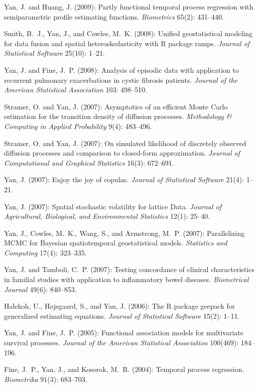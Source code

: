 \documentclass[Statistics]{vita}
\begin{document}
\begin{vita}
\begin{Publications}
\begin{RefereedJournalArticles}
  \item Yan, J. and Huang, J. (2009): Partly functional temporal process regression with semiparametric profile estimating functions. {\em Biometrics\/} 65(2): 431--440.
  \item Smith, B.~J., Yan, J., and Cowles, M.~K. (2008): Unified geostatistical modeling for data fusion and spatial heteroskedasticity with R package ramps. {\em Journal of Statistical Software\/} 25(10): 1--21.
  \item Yan, J. and Fine, J.~P. (2008): Analysis of episodic data with application to recurrent pulmonary exacerbations in cystic fibrosis patients. {\em Journal of the American Statistical Association\/}  103: 498--510.
  \item Stramer, O. and Yan, J. (2007): Asymptotics of an efficient {M}onte {C}arlo estimation for the transition density of diffusion processes. {\em Methodology \& Computing in Applied Probability\/} 9(4): 483--496.
  \item Stramer, O. and Yan, J. (2007): On simulated likelihood of discretely observed diffusion processes and comparison to closed-form approximation. {\em Journal of Computational and Graphical Statistics\/} 16(3): 672--691.
  \item Yan, J. (2007): Enjoy the joy of copulas. {\em Journal of Statistical Software\/} 21(4): 1--21.
  \item Yan, J. (2007): Spatial stochastic volatility for lattice Data. \emph{Journal of Agricultural, Biological, and Environmental Statistics} 12(1): 25--40.
  \item Yan, J., Cowles, M.~K., Wang, S., and  Armstrong, M.~P. (2007): Parallelizing MCMC for Bayesian spatiotemporal geostatistical models. {\em Statistics and Computing\/} 17(4): 323--335.
  \item Yan, J. and Tamboli, C.~P. (2007): Testing concordance of clinical characteristics in familial studies with application to inflammatory bowel diseases. {\em Biometrical Journal\/} 49(6): 840--853.
  \item Halekoh, U., H\o{}jsgaard, S., and Yan, J. (2006): The {R} package geepack for generalized estimating equations. {\em Journal of Statistical Software\/} 15(2): 1--11.
  \item Yan, J. and Fine, J.~P. (2005): Functional association models for multivariate survival processes. {\em Journal of the American Statistical Association\/} 100(469): 184--196.
  \item Fine, J.~P., Yan, J., and Kosorok, M.~R. (2004): Temporal process regression. {\em Biometrika\/} 91(3): 683--703.

\end{RefereedJournalArticles}
\end{Publications}
\end{vita}
\end{document}
